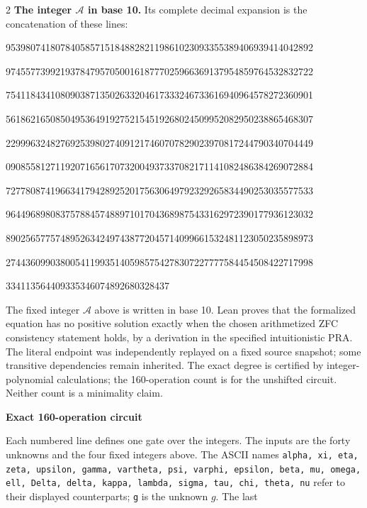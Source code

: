 \documentclass[10pt]{article}
\begin{document}
\begin{multicols}{2}
\textbf{The integer $\mathcal A$ in base 10.}
Its complete decimal expansion is the concatenation of these lines:\par
\begingroup\fontsize{7.7}{8.2}\selectfont{}\par
95398074180784058571518488282119861023093355389406939414042892\par
97455773992193784795705001618777025966369137954859764532832722\par
75411843410809038713502633204617333246733616940964578272360901\par
56186216508504953649192752154519268024509952082950238865468307\par
22999632482769253980274091217460707829023970817244790340704449\par
09085581271192071656170732004937337082171141082486384269072884\par
72778087419663417942892520175630649792329265834490253035577533\par
96449689808375788457488971017043689875433162972390177936123032\par
89025657757489526342497438772045714099661532481123050235898973\par
27443609903800541199351405985754278307227777584454508422717998\par
334113564409335346074892680328437\par
\endgroup
\normalfont\fontsize{7.7}{8.2}\selectfont
The fixed integer $\mathcal A$ above is written in base 10. Lean proves that the formalized equation has no positive solution exactly
when the chosen arithmetized ZFC consistency statement holds, by a derivation
in the specified intuitionistic PRA. The literal endpoint was independently
replayed on a fixed source snapshot; some transitive dependencies remain
inherited. The exact degree is certified by integer-polynomial calculations;
the 160-operation count is for the unshifted circuit. Neither count is a
minimality claim.
\end{multicols}
\clearpage
\begin{center}{\large\bfseries Exact 160-operation circuit}\end{center}
Each numbered line defines one gate over the integers. The inputs are the
forty unknowns and the four fixed integers above. The ASCII names
\texttt{alpha, xi, eta, zeta, upsilon, gamma, vartheta, psi, varphi, epsilon, beta, mu, omega, ell, Delta, delta, kappa, lambda, sigma, tau, chi, theta, nu}
refer to their displayed counterparts; \texttt{g} is the unknown $g$. The last
\end{document}
